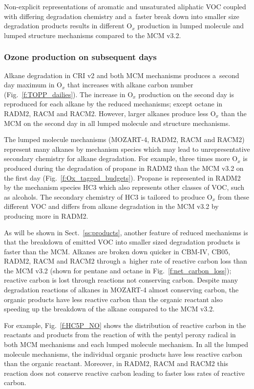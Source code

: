 \documentclass[acpd, online, hvmath]{copernicus}
\begin{document}
Non-explicit representations of aromatic and unsaturated aliphatic VOC
coupled with differing degradation chemistry and a~faster break down
into smaller size degradation products results in different O$_{x}$
production in lumped molecule and lumped structure mechanisms compared
to the MCM v3.2.

\subsubsection{Ozone production on subsequent days}
\label{sss:profiles}

Alkane degradation in CRI v2 and both MCM mechanisms produces a~second
day maximum in O$_{x}$ that increases with alkane carbon number
(Fig.~\ref{f:TOPP_dailies}).  The increase in O$_{x}$ production on
the second day is reproduced for each alkane by the reduced
mechanisms; except octane in RADM2, RACM and RACM2.  However, larger
alkanes produce less O$_{x}$ than the MCM on the second day in all
lumped molecule and structure mechanisms.

The lumped molecule mechanisms (MOZART-4, RADM2, RACM and RACM2)
represent many alkanes by mechanism species which may lead to
unrepresentative secondary chemistry for alkane degradation.  For
example, three times more O$_{x}$ is produced during the
degradation of propane in RADM2 than the MCM v3.2 on the first day
(Fig.~\ref{f:Ox_tagged_budgets}).  Propane is represented in RADM2 by
the mechanism species HC3 which also represents other classes of VOC,
such as alcohols.  The secondary chemistry of HC3 is tailored to
produce O$_{x}$ from these different VOC and differs from alkane
degradation in the MCM v3.2 by producing more  in RADM2.

As will be shown in Sect.~\ref{ss:products}, another feature of
reduced mechanisms is that the breakdown of emitted VOC into smaller
sized degradation products is faster than the MCM.  Alkanes are broken
down quicker in CBM-IV, CB05, RADM2, RACM and RACM2 through a~higher
rate of reactive carbon loss than the MCM v3.2 (shown for pentane and
octane in Fig.~\ref{f:net_carbon_loss}); reactive carbon is lost
through reactions not conserving carbon.  Despite many degradation
reactions of alkanes in MOZART-4 almost conserving carbon, the organic
products have less reactive carbon than the organic reactant also
speeding up the breakdown of the alkane compared to the MCM v3.2.

For example, Fig.~\ref{f:HC5P_NO} shows the distribution of reactive
carbon in the reactants and products from the reaction of 
with the pentyl peroxy radical in both MCM mechanisms and each lumped
molecule mechanism.  In all the lumped molecule mechanisms, the
individual organic products have less reactive carbon than the organic
reactant.  Moreover, in RADM2, RACM and RACM2 this reaction does not
conserve reactive carbon leading to faster loss rates of reactive
carbon.
\end{document}
